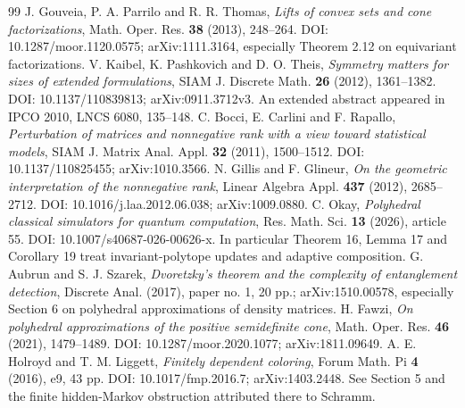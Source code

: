 \begin{thebibliography}{99}
 J. Gouveia, P. A. Parrilo and R. R. Thomas,
\emph{Lifts of convex sets and cone factorizations}, Math. Oper. Res.
\textbf{38} (2013), 248--264. DOI: 10.1287/moor.1120.0575;
arXiv:1111.3164, especially Theorem 2.12 on equivariant factorizations.
 V. Kaibel, K. Pashkovich and D. O. Theis,
\emph{Symmetry matters for sizes of extended formulations},
SIAM J. Discrete Math. \textbf{26} (2012), 1361--1382.
DOI: 10.1137/110839813; arXiv:0911.3712v3.
An extended abstract appeared in IPCO 2010, LNCS 6080, 135--148.
 C. Bocci, E. Carlini and F. Rapallo,
\emph{Perturbation of matrices and nonnegative rank with a view toward
statistical models}, SIAM J. Matrix Anal. Appl. \textbf{32} (2011),
1500--1512. DOI: 10.1137/110825455; arXiv:1010.3566.
 N. Gillis and F. Glineur,
\emph{On the geometric interpretation of the nonnegative rank},
Linear Algebra Appl. \textbf{437} (2012), 2685--2712.
DOI: 10.1016/j.laa.2012.06.038; arXiv:1009.0880.
 C. Okay, \emph{Polyhedral classical simulators for quantum
computation}, Res. Math. Sci. \textbf{13} (2026), article 55.
DOI: 10.1007/s40687-026-00626-x. In particular Theorem 16, Lemma 17
and Corollary 19 treat invariant-polytope updates and adaptive composition.
 G. Aubrun and S. J. Szarek,
\emph{Dvoretzky's theorem and the complexity of entanglement detection},
Discrete Anal. (2017), paper no. 1, 20 pp.; arXiv:1510.00578,
especially Section 6 on polyhedral approximations of density matrices.
 H. Fawzi,
\emph{On polyhedral approximations of the positive semidefinite cone},
Math. Oper. Res. \textbf{46} (2021), 1479--1489.
DOI: 10.1287/moor.2020.1077; arXiv:1811.09649.
 A. E. Holroyd and T. M. Liggett,
\emph{Finitely dependent coloring}, Forum Math. Pi \textbf{4} (2016),
e9, 43 pp. DOI: 10.1017/fmp.2016.7; arXiv:1403.2448.
See Section 5 and the finite hidden-Markov obstruction attributed there
to Schramm.
\end{thebibliography}
